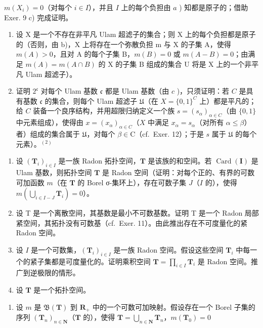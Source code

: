 \(m(X_{i}) = 0\)（对每个 \(i \in I\)），并且 \(I\) 上的每个负担由 \(a\) ) 知都是原子的；借助 Exer. 9 c) 完成证明。

\begin{enumerate}
\def\labelenumi{\alph{enumi})}
\setcounter{enumi}{2}
\item
  设 X 是一个不存在非平凡 Ulam 超滤子的集合；则 X 上的每个负担都是原子的（否则，由 b)，X 上将存在一个弥散负担 m 与 X 的子集 A，使得 \(m(A) > 0\)，且对 A 的每个子集 B，\(m(B) = 0\) 或 \(m(A - B) = 0\)；由满足 \(m(A) = m(A \cap B)\) 的 X 的子集 B 组成的集合 U 将是 X 上的一个非平凡 Ulam 超滤子）。
\item
  证明 \(2^{\mathfrak{c}}\) 对每个 Ulam 基数 \(\mathfrak{c}\) 都是 Ulam 基数（由 \(c\) )，只须证明：若 \(C\) 是具有基数 \(\mathfrak{c}\) 的集合，则每个 Ulam 超滤子 \(\mathfrak{U}\)（在 \(X = \{0,1\}^{C}\) 上）都是平凡的；给 \(C\) 装备一个良序结构，并用超限归纳定义一个族 \(s = (s_{\alpha})_{\alpha \in C}\)（由 \(\{0,1\}\) 中元素组成），使得由 \(x = (x_{\alpha})_{\alpha \in C}\)（\(X\) 中满足 \(x_{\alpha}=s_{\alpha}\)（对所有 \(\alpha\leqslant\beta\)）者）组成的集合属于 \(\mathfrak{U}\)，对每个 \(\beta\in\mathrm{C}\)（cf.~Exer. 12）；于是 \(s\) 属于 \(\mathfrak{U}\) 的每个元素）。\(^{(2)}\)
\end{enumerate}

\begin{enumerate}
\def\labelenumi{\arabic{enumi})}
\setcounter{enumi}{13}
\item
  设 \((\mathbf{T}_i)_{i\in I}\) 是一族 Radon 拓扑空间，\(\mathbf{T}\) 是该族的和空间。若 \(\operatorname{Card}(\mathbf{I})\) 是 Ulam 基数，则拓扑空间 \(\mathbf{T}\) 是 Radon 空间（证明：对每个正的、有界的可数可加函数 \(m\)（在 \(\mathbf{T}\) 的 Borel σ-集环上），存在可数子集 \(J\)（\(I\) 的），使得 \(m(\bigcup_{i \in I - J} \mathbf{T}_i) = 0\)）。
\item
  设 T 是一个离散空间，其基数是最小不可数基数。证明 T 是一个 Radon 局部紧空间，其拓扑没有可数基（cf.~Exer. 11）。由此推出存在不可度量化的紧 Radon 空间。
\item
  设 \(I\) 是一个可数集，\((\mathbf{T}_i)_{i \in I}\) 是一族 Radon 空间。假设这些空间 \(\mathbf{T}_i\) 中每一个的紧子集都是可度量化的。证明乘积空间 \(\mathbf{T} = \prod_{i \in I} \mathbf{T}_i\) 是 Radon 空间。推广到逆极限的情形。
\item
  设 \(\mathbf{T}\) 是一个拓扑空间。
\end{enumerate}

\begin{enumerate}
\def\labelenumi{\alph{enumi})}
\tightlist
\item
  设 \(m\) 是 \(\mathfrak{B}(\mathbf{T})\) 到 \(\mathbf{R}_+\) 中的一个可数可加映射。假设存在一个 Borel 子集的序列 \((\mathbf{T}_n)_{n\in \mathbf{N}}\)（\(\mathbf{T}\) 的），使得 \(\mathbf{T} = \bigcup_{n\in \mathbf{N}}\mathbf{T}_n\)，\(m(\mathbf{T}_0) = 0\)
\end{enumerate}

